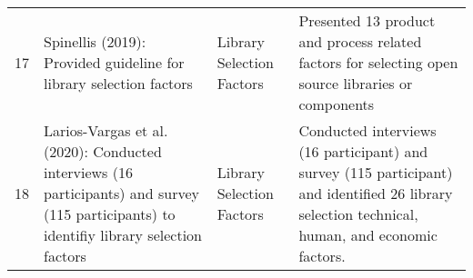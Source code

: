 \begin{table*}[htbp]
\begin{tabular}{rp{18.585em}p{6em}p{28.085em}}
    17 & Spinellis (2019): Provided guideline for library selection factors \cite{spinellis2019select}  & Library Selection Factors & Presented 13 product and process related factors for selecting open source libraries or components \\
    18 & Larios-Vargas et al. (2020): Conducted interviews (16 participants) and survey (115 participants) to identifiy library selection factors \cite{larios2020selecting}  & Library Selection Factors & Conducted interviews (16 participant) and survey (115 participant) and identified 26 library selection technical, human, and economic factors. \\
    \bottomrule
    \end{tabular}%
  \label{tab:related-works}%
\end{table*}%
